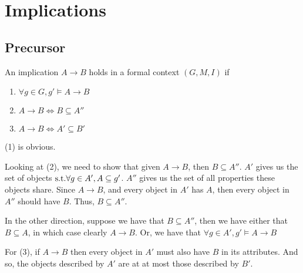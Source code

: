 \section{Implications}
\label{sec:Implications}

\subsection{Precursor} 
An implication $A \rightarrow B$ holds in a formal context $(G,M,I)$ if 
\begin{enumerate}
    \item $\forall g\in G, g' \models A\rightarrow B$
    \item $A \rightarrow B \iff B \subseteq A''$ 
    \item $A \rightarrow B \iff A' \subseteq B'$ 
\end{enumerate}

(1) is obvious.

Looking at (2), we need to show that given $A \rightarrow B$, then $B \subseteq A''$. $A'$ gives us the set of objects $\text{s.t.} \forall g \in A', A \subseteq g'$. $A''$ gives us the set of all properties these objects share. Since $A \rightarrow B$, and every object in $A'$ has $A$, then every object in $A''$ should have $B$. Thus, $B \subseteq A''$.   

In the other direction, suppose we have that $B \subseteq A''$, then we have either that $B \subseteq A$, in which case clearly $A \rightarrow B$. Or, we have that $\forall g \in A', g' \models A \rightarrow B$ 

For (3), if $A \rightarrow B$ then every object in $A'$ must also have $B$ in its attributes. And so, the objects described by $A'$ are at at most those described by $B'$. 